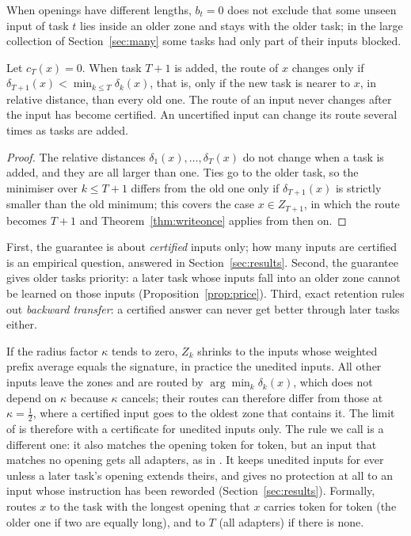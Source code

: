 When openings have different lengths, $b_t = 0$ does not exclude that some unseen input of task $t$ lies inside an older zone and stays with the older task; in the large collection of Section~\ref{sec:many} some tasks had only part of their inputs blocked.

\begin{proposition}
\label{prop:uncertified}
Let $c_T(x) = 0$. When task $T+1$ is added, the route of $x$ changes only if
$\delta_{T+1}(x) < \min_{k \le T} \delta_k(x)$, that is, only if the new task is nearer to $x$, in
relative distance, than every old one. The route of an input never changes after the input has
become certified. An uncertified input can change its route several times as tasks are added.
\end{proposition}

\begin{proof}
The relative distances $\delta_1(x), \dots, \delta_T(x)$ do not change when a task is added, and
they are all larger than one. Ties go to the older task, so the minimiser over $k \le T+1$ differs
from the old one only if $\delta_{T+1}(x)$ is strictly smaller than the old minimum; this covers
the case $x \in Z_{T+1}$, in which the route becomes $T+1$ and Theorem~\ref{thm:writeonce} applies
from then on.
\end{proof}

\begin{remark}
\label{rem:consequences}
First, the guarantee is about \emph{certified} inputs only; how many inputs are certified is an
empirical question, answered in Section~\ref{sec:results}. Second, the guarantee gives older tasks
priority: a later task whose inputs fall into an older zone cannot be learned on those inputs
(Proposition~\ref{prop:price}). Third, exact retention rules out \emph{backward transfer}: a
certified answer can never get better through later tasks either.
\end{remark}

\begin{remark}
\label{rem:keyswitch}
If the radius factor $\kappa$ tends to zero, $Z_k$ shrinks to the inputs whose weighted prefix
average equals the signature, in practice the unedited inputs. All other inputs leave the zones and are routed by $\arg\min_k \delta_k(x)$, which does not depend on $\kappa$ because $\kappa$ cancels;
their routes can therefore differ from those at $\kappa = \tfrac12$, where a certified input goes to the oldest zone that contains it. The limit of \cert{} is therefore
\nearest{} with a certificate for unedited inputs only. The rule we call \keyswitch{} is a different
one: it also matches the opening token for token, but an input that matches no opening gets all
adapters, as in \plain{}. It keeps unedited inputs for ever unless a later task's opening extends theirs, and gives no protection at all to an
input whose instruction has been reworded (Section~\ref{sec:results}). Formally, \keyswitch{} routes $x$ to the task with the
longest opening that $x$ carries token for token (the older one if two are equally long), and to $T$ (all adapters) if there is none.
\end{remark}

